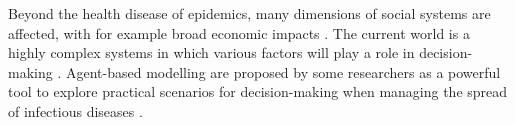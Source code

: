 \documentclass[smallextended]{svjour3}       %
\begin{document}
Beyond the health disease of epidemics, many dimensions of social systems are affected, with for example broad economic impacts \cite{boucekkine2021economics}. The current world is a highly complex systems in which various factors will play a role in decision-making \cite{bickley2021does}.
Agent-based modelling are proposed by some researchers as a powerful tool to explore practical scenarios for decision-making when managing the spread of infectious diseases \cite{miksch2019should}.



\end{document}
